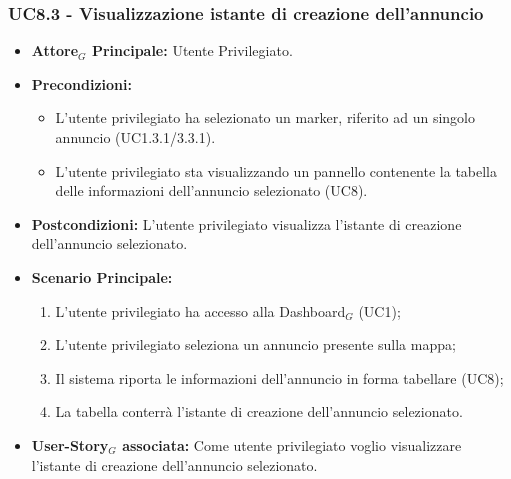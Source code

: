 \documentclass[11pt]{article}
\begin{document}
\begin{justify}
 \subsubsection{\textbf{UC8.3 - Visualizzazione istante di creazione dell'annuncio}}
 \begin{itemize}
     \item \textbf{Attore$_G$ Principale:} Utente Privilegiato.
     \item \textbf{Precondizioni:}
       \begin{itemize}
    	        \item L'utente privilegiato ha selezionato un marker, riferito ad un singolo annuncio (UC1.3.1/3.3.1).
          \item L'utente privilegiato sta visualizzando un pannello contenente la tabella delle informazioni dell'annuncio selezionato (UC8).
       \end{itemize}
     \item \textbf{Postcondizioni:} L'utente privilegiato visualizza l'istante di creazione dell'annuncio selezionato.
     \item \textbf{Scenario Principale:}
        \begin{enumerate}
            \item L'utente privilegiato ha accesso alla Dashboard$_G$ (UC1);
            \item L'utente privilegiato seleziona un annuncio presente sulla mappa;
            \item Il sistema riporta le informazioni dell'annuncio in forma tabellare (UC8);
            \item La tabella conterrà l'istante di creazione dell'annuncio selezionato.
        \end{enumerate}
     \item \textbf{User-Story$_G$ associata:} Come utente privilegiato voglio visualizzare l'istante di creazione dell'annuncio selezionato. 
 \end{itemize}

\end{justify}
\end{document}
